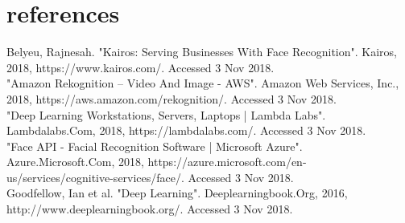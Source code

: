 \documentclass[onecolumn, draftclsnofoot,10pt, compsoc]{IEEEtran}
\begin{document}
    \section{references}
    Belyeu, Rajnesah. "Kairos: Serving Businesses With Face Recognition". Kairos, 2018, https://www.kairos.com/. Accessed 3 Nov 2018. \\
    [2] "Amazon Rekognition – Video And Image - AWS". Amazon Web Services, Inc., 2018, https://aws.amazon.com/rekognition/. Accessed 3 Nov 2018.\\
    [3] "Deep Learning Workstations, Servers, Laptops | Lambda Labs". Lambdalabs.Com, 2018, https://lambdalabs.com/. Accessed 3 Nov 2018.\\
    [4] "Face API - Facial Recognition Software | Microsoft Azure". Azure.Microsoft.Com, 2018, https://azure.microsoft.com/en-us/services/cognitive-services/face/. Accessed 3 Nov 2018.\\
    [5] Goodfellow, Ian et al. "Deep Learning". Deeplearningbook.Org, 2016, http://www.deeplearningbook.org/. Accessed 3 Nov 2018.
\end{document}
